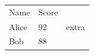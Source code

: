 \documentclass{article}
\begin{document}
\begin{tabular}{ll}
Name & Score \\
Alice & 92 & extra \\
Bob & 88 \\
\end{tabular}
\end{document}
